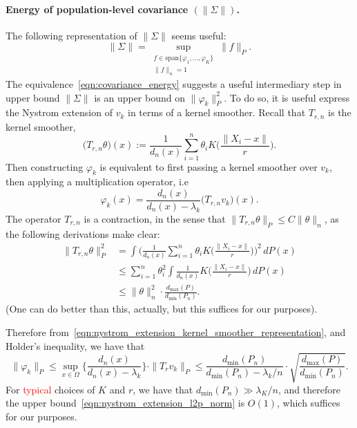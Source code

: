 \documentclass{article}
\newcommand{\1}{\mathbf{1}}
\theoremstyle{definition}
\theoremstyle{remark}
\begin{document}
\paragraph{Energy of population-level covariance $(\|\Sigma\|)$.}
The following representation of $\|\Sigma\|$ seems useful:
\begin{equation}
\label{eqn:covariance_energy}
\|\Sigma\| = \sup_{\substack{f \in \mathrm{span}\{\varphi_1,\ldots,\varphi_K\} \\ \|f\|_n = 1}} \|f\|_P.
\end{equation}
The equivalence~\eqref{eqn:covariance_energy} suggests a useful intermediary step in upper bound $\|\Sigma\|$ is an upper bound on $\|\varphi_k\|_P^2$. To do so, it is useful express the Nystrom extension of $v_k$ in terms of a kernel smoother. Recall that $T_{r,n}$ is the kernel smoother,
\begin{equation*}
\bigl(T_{r,n}\theta\bigr)(x) := \frac{1}{d_n(x)} \sum_{i = 1}^{n} \theta_i K\biggl(\frac{\|X_i - x\|}{r}\biggr).
\end{equation*}
Then constructing $\varphi_k$ is equivalent to first passing a kernel smoother over $v_k$, then applying a multiplication operator, i.e
\begin{equation}
\label{eqn:nystrom_extension_kernel_smoother_representation}
\varphi_k(x) = \frac{d_n(x)}{d_n(x) - \lambda_k} \bigl(T_{r,n}v_k\bigr)(x).
\end{equation}  
The operator $T_{r,n}$ is a contraction, in the sense that $\|T_{r,n}\theta\|_P \leq C \|\theta\|_n$, as the following derivations make clear:
\begin{align*}
\|T_{r,n}\theta\|_P^2 & = \int \Biggl(\frac{1}{d_n(x)} \sum_{i = 1}^{n} \theta_i K\biggl(\frac{\|X_i - x\|}{r}\biggr)\Biggr)^2 \,dP(x) \\
& \leq \sum_{i = 1}^{n} \theta_i^2 \int \frac{1}{d_n(x)}  K\biggl(\frac{\|X_i - x\|}{r}\biggr) \,dP(x) \\
& \leq \|\theta\|_n^2 \cdot \frac{d_{\max}(P)}{d_{\min}(P_n)}.
\end{align*}
(One can do better than this, actually, but this suffices for our purposes).

Therefore from~\eqref{eqn:nystrom_extension_kernel_smoother_representation}, and Holder's inequality, we have that
\begin{equation}
\label{eqn:nystrom_extension_l2p_norm}
\|\varphi_k\|_P \leq \sup_{x \in \Omega} \biggl\{\frac{d_n(x)}{d_n(x) - \lambda_k} \biggr\} \cdot  \|T_rv_k\|_P \leq \frac{d_{\min}(P_n)}{d_{\min}(P_n) - \lambda_k/n} \cdot \sqrt{ \frac{d_{\max}(P)}{d_{\min}(P_n)}}.
\end{equation}
For \textcolor{red}{typical} choices of $K$ and $r$, we have that $d_{\min}(P_n) \gg \lambda_K/n$, and therefore the upper bound~\eqref{eqn:nystrom_extension_l2p_norm} is $O(1)$, which suffices for our purposes.
\end{document}
